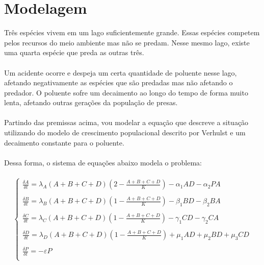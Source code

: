 \documentclass[a4paper]{article}
\begin{document}
\section{Modelagem}
Tr\^es esp\'ecies vivem em um lago suficientemente grande. Essas esp\'ecies competem pelos recursos do meio ambiente mas n\~ao se predam. Nesse mesmo lago, existe uma quarta esp\'ecie que preda as outras tr\^es.
\\
\\
Um acidente ocorre e despeja um certa quantidade de poluente nesse lago, afetando negativamente as esp\'ecies que s\~ao predadas mas n\~ao afetando o predador. O poluente sofre um decaimento ao longo do tempo de forma muito lenta, afetando outras gera\c{c}\~oes da popula\c{c}\~ao de presas.
\\
\\
Partindo das premissas acima, vou modelar a equa\c{c}\~ao que descreve a situa\c{c}\~ao utilizando do modelo de crescimento populacional descrito por Verhulst e um decaimento constante para o poluente.
\\\
\\
Dessa forma, o sistema de equa\c{c}\~oes abaixo modela o problema:
\\
\\
\begin{equation}
\left\{\begin{array}{l}
\frac{\delta A}{\delta t} =  \lambda_A (A + B + C + D)(2 - \frac{A + B + C +D}{K}) -\alpha_1AD - \alpha_2PA  \\
\\
\frac{\delta B}{\delta t} =  \lambda_B (A + B + C + D)(1 - \frac{A + B + C +D}{K}) -\beta_1BD - \beta_2BA  \\
\\
\frac{\delta C}{\delta t} =  \lambda_C (A + B + C + D)(1 - \frac{A + B + C +D}{K}) -\gamma_1CD - \gamma_2CA  \\
\\
\frac{\delta D}{\delta t} =  \lambda_D (A + B + C + D)(1 - \frac{A + B + C +D}{K}) + \mu_1AD + \mu_2 BD + \mu_3CD  \\
\\
\frac{\delta P}{\delta t} = - \varepsilon P \\
\end{array}
\end{equation}
\\
\end{document}
